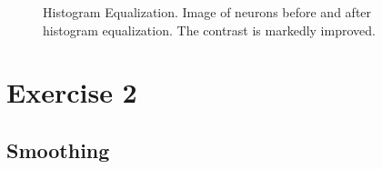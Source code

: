 \documentclass[11pt,a4paper]{article}
\begin{document}
\begin{figure}
\quad
{}
\caption{Histogram Equalization. Image of neurons before and after histogram equalization. The contrast is markedly improved.}%
\label{fig:eq}%
\end{figure}

\section{Exercise 2}
\subsection{Smoothing}
\end{document}
